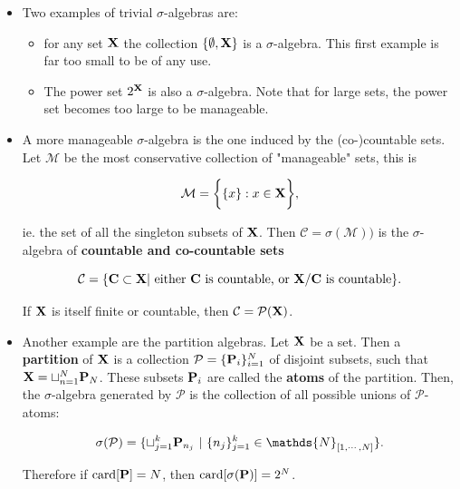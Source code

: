 \documentclass{homework}
\begin{document}
\begin{itemize}
    \item Two examples of trivial $\sigma$-algebras are:
    \begin{itemize}
        \item for any set ${\bf X}$ the collection $\{\emptyset, {\bf X}\}$ is a $\sigma$-algebra. This first example is far too small to be of any use.
        \item The power set $2^{\bf X}$ is also a $\sigma$-algebra. Note that for large sets, the power set becomes too large to be manageable.\\
    \end{itemize}
    
    \item A more manageable $\sigma$-algebra is the one induced by the (co-)countable sets. Let $\mathcal{M}$ be the most conservative collection of "manageable" sets, this is 
    
    $$
    \mathcal{M} = \bigg\{\{x\}: x \in {\bf X} \bigg\},
    $$
    
    ie. the set of all the singleton subsets of ${\bf X}$. Then $\mathcal{C} = \sigma(\mathcal{M}))$ is the $\sigma$-algebra of \textbf{countable and co-countable sets} 
    
    $$
    \mathcal{C} = \{{\bf C} \subset {\bf X} | \textnormal{ either } {\bf C} \textnormal{ is countable, or } {\bf X}/{\bf C} \textnormal{ is countable}\}.
    $$
    
    If ${\bf X}$ is itself finite or countable, then $\mathcal{C} = \mathcal{P}({\bf X})$. \\
    
    \item Another example are the partition algebras. Let ${\bf X}$ be a set. Then a \textbf{partition} of ${\bf X}$ is a collection $\mathcal{P} = \{{\bf P}_i\}_{i=1}^{N}$ of disjoint subsets, such that ${\bf X}= \sqcup_{n=1}^{N} {\bf P}_N$. These subsets ${\bf P}_i$ are called the \textbf{atoms} of the partition. Then, the $\sigma$-algebra generated by $\mathcal{P}$ is the collection of all possible unions of $\mathcal{P}$-atoms:
    
    $$
    \sigma(\mathcal{P}) = \{\sqcup_{j=1}^{k}{\bf P}_{n_j}\textnormal{ }|\textnormal{ } \{n_j\}_{j=1}^{k} \in \mathds{N}_{[1, \cdots, N]}\}.
    $$
    
    Therefore if $\textnormal{card}[{\bf P}] = N$, then $\textnormal{card}[\sigma({\bf P})] = 2^N$. \\
    

\end{itemize}
\end{document}
